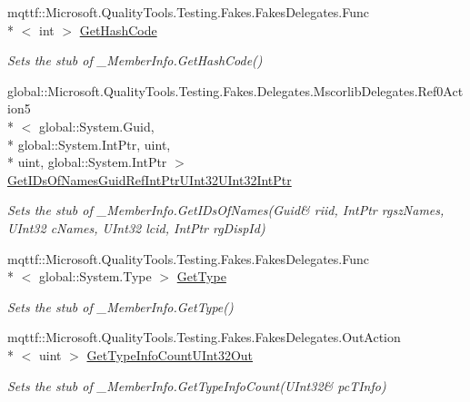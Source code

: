 \begin{DoxyCompactItemize}
mqttf\-::\-Microsoft.\-Quality\-Tools.\-Testing.\-Fakes.\-Fakes\-Delegates.\-Func\\*
$<$ int $>$ \hyperlink{class_system_1_1_runtime_1_1_interop_services_1_1_fakes_1_1_stub___member_info_a898a56617d1f6c58561e06725d7dfcb2}{Get\-Hash\-Code}
\begin{DoxyCompactList}\small\item\em Sets the stub of \-\_\-\-Member\-Info.\-Get\-Hash\-Code()\end{DoxyCompactList}\item 
global\-::\-Microsoft.\-Quality\-Tools.\-Testing.\-Fakes.\-Delegates.\-Mscorlib\-Delegates.\-Ref0\-Action5\\*
$<$ global\-::\-System.\-Guid, \\*
global\-::\-System.\-Int\-Ptr, uint, \\*
uint, global\-::\-System.\-Int\-Ptr $>$ \hyperlink{class_system_1_1_runtime_1_1_interop_services_1_1_fakes_1_1_stub___member_info_ae357857f903996181c388fb4393bea49}{Get\-I\-Ds\-Of\-Names\-Guid\-Ref\-Int\-Ptr\-U\-Int32\-U\-Int32\-Int\-Ptr}
\begin{DoxyCompactList}\small\item\em Sets the stub of \-\_\-\-Member\-Info.\-Get\-I\-Ds\-Of\-Names(Guid\& riid, Int\-Ptr rgsz\-Names, U\-Int32 c\-Names, U\-Int32 lcid, Int\-Ptr rg\-Disp\-Id)\end{DoxyCompactList}\item 
mqttf\-::\-Microsoft.\-Quality\-Tools.\-Testing.\-Fakes.\-Fakes\-Delegates.\-Func\\*
$<$ global\-::\-System.\-Type $>$ \hyperlink{class_system_1_1_runtime_1_1_interop_services_1_1_fakes_1_1_stub___member_info_a8832e2f609701ca0e3138c7767a5a40d}{Get\-Type}
\begin{DoxyCompactList}\small\item\em Sets the stub of \-\_\-\-Member\-Info.\-Get\-Type()\end{DoxyCompactList}\item 
mqttf\-::\-Microsoft.\-Quality\-Tools.\-Testing.\-Fakes.\-Fakes\-Delegates.\-Out\-Action\\*
$<$ uint $>$ \hyperlink{class_system_1_1_runtime_1_1_interop_services_1_1_fakes_1_1_stub___member_info_ae9a3a78e453ff5fc2f6e9ae6ecf24e1e}{Get\-Type\-Info\-Count\-U\-Int32\-Out}
\begin{DoxyCompactList}\small\item\em Sets the stub of \-\_\-\-Member\-Info.\-Get\-Type\-Info\-Count(U\-Int32\& pc\-T\-Info)\end{DoxyCompactList}\item 

\end{DoxyCompactItemize}
